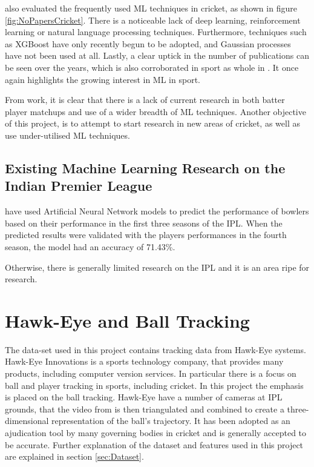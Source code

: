 \documentclass[12pt,a4paper]{report}
\theoremstyle{definition}
\begin{document}
\citet{Wickramasinghe2022} also evaluated the frequently used ML techniques in cricket, as shown in figure \ref{fig:NoPapersCricket}. 
There is a noticeable lack of deep learning, reinforcement learning or natural language processing techniques.
Furthermore, techniques such as XGBoost have only recently begun to be adopted, and Gaussian processes have not been used at all.
Lastly, a clear uptick in the number of publications can be seen over the years, which is also corroborated in sport as whole in \citet{horvat2020}.
It once again highlights the growing interest in ML in sport.

From \citet{Wickramasinghe2022} work, it is clear that there is a lack of current research in both batter player matchups and use of a wider breadth of ML techniques. 
Another objective of this project, is to attempt to start research in new areas of cricket, as well as use under-utilised  ML techniques.

\subsection{Existing Machine Learning Research on the Indian Premier League}

\citet{Saikia2012} have used Artificial Neural Network models to predict the performance of bowlers based on their performance in the first three seasons of the IPL. 
When the predicted results were validated with the players performances in the fourth season, the model had an accuracy of 71.43\%.

Otherwise, there is generally limited research on the IPL and it is an area ripe for research.

\section{Hawk-Eye and Ball Tracking}

The data-set used in this project contains tracking data from Hawk-Eye systems.
Hawk-Eye Innovations is a sports technology company, that provides many products, including computer version services.
In particular there is a focus on ball and player tracking in sports, including cricket.
In this project the emphasis is placed on the ball tracking.
Hawk-Eye have a number of cameras at IPL grounds, that the video from is then triangulated and combined to create a three-dimensional representation of the ball's trajectory.
It has been adopted as an ajudication tool by many governing bodies in cricket and is generally accepted to be accurate.
Further explanation of the dataset and features used in this project are explained in section \ref{sec:Dataset}.
\end{document}
